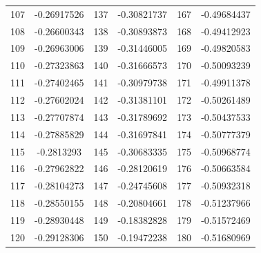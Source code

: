 \documentclass[
	12pt,				%
	openright,			%
	twoside,			%
	a4paper,			%
	english,			%
	french,				%
	spanish,			%
	brazil,				%
	]{abntex2}
\begin{document}
\begin{apendicesenv}
\begin{table}[H]
\begin{tabular}{c c| c c | c c}
107 & -0.26917526 & 137 & -0.30821737 & 167 & -0.49684437\\
108 & -0.26600343 & 138 & -0.30893873 & 168 & -0.49412923\\
109 & -0.26963006 & 139 & -0.31446005 & 169 & -0.49820583\\
110 & -0.27323863 & 140 & -0.31666573 & 170 & -0.50093239\\
111 & -0.27402465 & 141 & -0.30979738 & 171 & -0.49911378\\
112 & -0.27602024 & 142 & -0.31381101 & 172 & -0.50261489\\
113 & -0.27707874 & 143 & -0.31789692 & 173 & -0.50437533\\
114 & -0.27885829 & 144 & -0.31697841 & 174 & -0.50777379\\
115 & -0.2813293 & 145 & -0.30683335 & 175 & -0.50968774\\
116 & -0.27962822 & 146 & -0.28120619 & 176 & -0.50663584\\
117 & -0.28104273 & 147 & -0.24745608 & 177 & -0.50932318\\
118 & -0.28550155 & 148 & -0.20804661 & 178 & -0.51237966\\
119 & -0.28930448 & 149 & -0.18382828 & 179 & -0.51572469\\
120 & -0.29128306 & 150 & -0.19472238 & 180 & -0.51680969
\end{tabular}
\end{table}



\end{apendicesenv}
\end{document}
